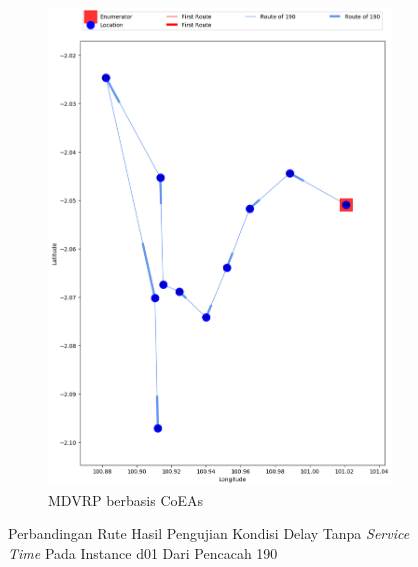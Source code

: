 \begin{figure}[H]
	\centering
	\begin{subfigure}[t]{\textwidth}
		\centering
		\includegraphics[width=\textwidth]{Resources/Images/delayed_1/real_m15_n100_delayed_1_190_coes}
		\caption{MDVRP berbasis CoEAs}
		\label{fig:real_m15_n100_delayed_1_190_coes}
	\end{subfigure}
	\caption{Perbandingan Rute Hasil Pengujian Kondisi Delay Tanpa \textit{Service Time} Pada Instance d01 Dari Pencacah 190}
	\label{fig:real_m15_n100_delayed_1_190}
\end{figure}


